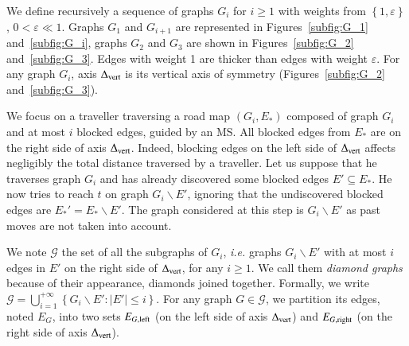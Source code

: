 \documentclass[preprint]{elsarticle}
\newcommand{\set}[1]{\left\{ #1 \right\}}
\newcommand{\card}[1]{\left| #1 \right|}
\newcommand{\mcalg}{\mathcal{G}}
\newcommand{\mcalr}{\mathcal{R}}
\newcommand{\mts}{MS}
\newcommand{\deltavert}{\Delta_{\mbox{\scriptsize{vert}}}}
\newcommand{\eleft}[1]{E_{#1, \mbox{\scriptsize{left}}}}
\newcommand{\eright}[1]{E_{#1, \mbox{\scriptsize{right}}}}
\begin{document}

We define recursively a sequence of graphs $G_i$ for $i \geq 1$ with weights from $\set{1,\varepsilon}$, $0 < \varepsilon \ll 1$. Graphs $G_1$ and $G_{i+1}$ are represented in Figures~\ref{subfig:G_1} and~\ref{subfig:G_i}, graphs $G_2$ and $G_3$ are shown in Figures~\ref{subfig:G_2} and~\ref{subfig:G_3}. Edges with weight 1 are thicker than edges with weight $\varepsilon$. For any graph $G_i$, axis $\deltavert$ is its vertical axis of symmetry (Figures~\ref{subfig:G_2} and~\ref{subfig:G_3}).


We focus on a traveller traversing a road map $\left(G_i,E_*\right)$ composed of graph $G_i$ and at most $i$ blocked edges, guided by an \mts . All blocked edges from $E_*$ are on the right side of axis $\deltavert$. Indeed, blocking edges on the left side of $\deltavert$ affects negligibly the total distance traversed by a traveller. Let us suppose that he traverses graph $G_i$ and has already discovered some blocked edges $E' \subseteq E_*$. He now tries to reach $t$ on graph $G_i\backslash E'$, ignoring that the undiscovered blocked edges are $E_*' = E_* \backslash E'$. The graph considered at this step is $G_i\backslash E'$ as past moves are not taken into account. 

We note $\mcalg$ the set of all the subgraphs of $G_i$, {\em i.e.} graphs $G_i\backslash E'$ with at most $i$ edges in $E'$ on the right side of $\deltavert$, for any $i \geq 1$. We call them \textit{diamond graphs} because of their appearance, diamonds joined together. Formally, we write $\mcalg = \bigcup_{i=1}^{+\infty} \set{G_i\backslash E' : \card{E'} \leq i}$. For any graph $G \in \mcalg$, we partition its edges, noted $E_G$, into two sets $\eleft{G}$ (on the left side of axis $\deltavert$) and $\eright{G}$ (on the right side of axis $\deltavert$). 
\end{document}
